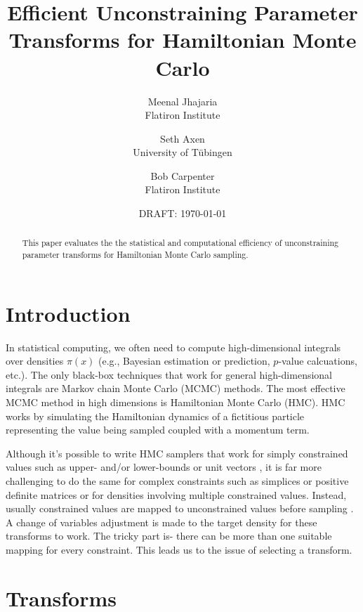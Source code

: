 \documentclass[11pt]{article}
\begin{document}
\title{Efficient Unconstraining
  Parameter Transforms for Hamiltonian Monte Carlo}
\author{Meenal Jhajaria \\ \small Flatiron Institute \and Seth Axen \\
  \small University of T\"ubingen \and Bob
  Carpenter \\ \small Flatiron Institute}
\date{DRAFT: \today}
\maketitle


\begin{abstract}
  \noindent
  This paper evaluates the the statistical and computational
  efficiency of unconstraining parameter transforms for Hamiltonian
  Monte Carlo sampling.
\end{abstract}

\section{Introduction}

In statistical computing, we often need to compute high-dimensional
integrals over densities $\pi(x)$ (e.g., Bayesian estimation or
prediction, $p$-value calcuations, etc.).  The only black-box
techniques that work for general high-dimensional integrals are
Markov chain Monte Carlo (MCMC) methods.  The most effective MCMC
method in high dimensions is Hamiltonian Monte Carlo (HMC).  HMC works
by simulating the Hamiltonian dynamics of a fictitious particle
representing the value being sampled coupled with a momentum term.

Although it's possible to write HMC samplers that work for simply
constrained values such as upper- and/or lower-bounds
\cite{neal2011mcmc} or unit vectors \cite{byrne2013geodesic}, it is
far more challenging to do the same for complex constraints such as
simplices or positive definite matrices or for densities involving
multiple constrained values.  Instead, usually constrained values are mapped to unconstrained values before sampling
\cite{}.  A change of variables adjustment is made to the target density for these transforms to work. The tricky part is- there can be more than one suitable mapping for every constraint. This leads us to the issue of selecting a transform. 


\section{Transforms}
\end{document}
